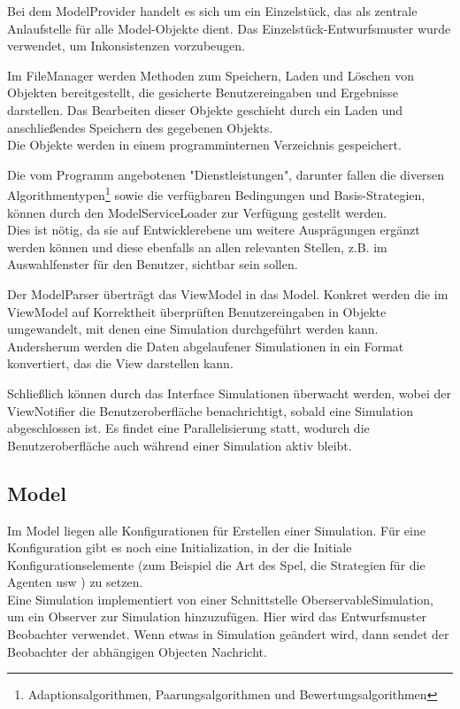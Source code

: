 Bei dem ModelProvider handelt es sich um ein Einzelstück, das als zentrale Anlaufstelle für alle Model-Objekte dient. Das Einzelstück-Entwurfsmuster wurde verwendet, um Inkonsistenzen vorzubeugen.

Im FileManager werden Methoden zum Speichern, Laden und Löschen von Objekten bereitgestellt, die gesicherte Benutzereingaben und Ergebnisse darstellen. Das Bearbeiten dieser Objekte geschieht durch ein Laden und anschließendes Speichern des gegebenen Objekts.\\
Die Objekte werden in einem programminternen Verzeichnis gespeichert.

Die vom Programm angebotenen "Dienstleistungen", darunter fallen die diversen Algorithmentypen\footnote{Adaptionsalgorithmen, Paarungsalgorithmen und Bewertungsalgorithmen} sowie die verfügbaren Bedingungen und Basis-Strategien, können durch den ModelServiceLoader zur Verfügung gestellt werden.\\
Dies ist nötig, da sie auf Entwicklerebene um weitere Ausprägungen ergänzt werden können und diese ebenfalls an allen relevanten Stellen, z.B. im Auswahlfenster für den Benutzer, sichtbar sein sollen.

Der ModelParser überträgt das ViewModel in das Model. Konkret werden die im ViewModel auf Korrektheit überprüften Benutzereingaben in Objekte umgewandelt, mit denen eine Simulation durchgeführt werden kann. Andersherum werden die Daten abgelaufener Simulationen in ein Format konvertiert, das die View darstellen kann.

Schließlich können durch das Interface Simulationen überwacht werden, wobei der ViewNotifier die Benutzeroberfläche benachrichtigt, sobald eine Simulation abgeschlossen ist. Es findet eine Parallelisierung statt, wodurch die Benutzeroberfläche auch während einer Simulation aktiv bleibt.

\subsection{Model}

\noindent
{}

Im Model liegen alle Konfigurationen für Erstellen einer Simulation. Für eine Konfiguration gibt es noch eine Initialization, in der die Initiale Konfigurationselemente (zum Beispiel die Art des Spel, die Strategien für die Agenten usw ) zu setzen. \\

Eine Simulation implementiert von einer Schnittstelle OberservableSimulation, um ein Observer zur Simulation hinzuzufügen. Hier wird das Entwurfsmuster Beobachter verwendet. Wenn etwas in Simulation geändert wird, dann sendet der Beobachter der abhängigen Objecten Nachricht.\\

